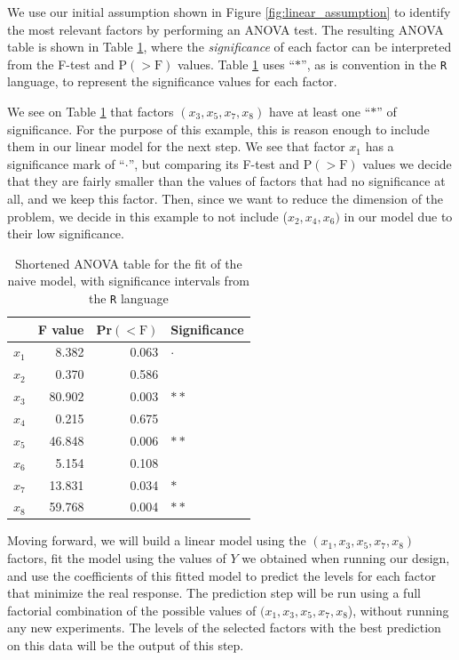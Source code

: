 \documentclass[conference]{IEEEtran}
\begin{document}
We use our initial assumption shown in Figure \ref{fig:linear_assumption} to
identify the most relevant factors by performing an ANOVA test. The resulting
ANOVA table is shown in Table \ref{tab:anova_linear}, where the \emph{significance}
of each factor can be interpreted from the F-test and P\((>\text{F})\) values.
Table \ref{tab:anova_linear} uses ``\(*\)'', as is convention in the \texttt{R}
language, to represent the significance values for each factor.

We see on Table \ref{tab:anova_linear} that factors \((x_3,x_5,x_7,x_8)\) have at
least one ``\(*\)'' of significance. For the purpose of this example, this is
reason enough to include them in our linear model for the next step. We see that
factor \(x_1\) has a significance mark of ``\(\cdot\)'', but comparing its F-test and
P\((>\text{F})\) values we decide that they are fairly smaller than the values of
factors that had no significance at all, and we keep this factor. Then, since we
want to reduce the dimension of the problem, we decide in this example to not
include (\(x_2,x_4,x_6)\) in our model due to their low significance.

\begin{table}[ht]
\centering
\caption{Shortened ANOVA table for the fit of the naive model, with significance intervals from the \texttt{R} language}
\label{tab:anova_linear}
\begingroup\small
\begin{tabular}{lrrl}
  \toprule
 & F value & Pr$(<\text{F})$ & Significance \\
  \midrule
$x_1$ & 8.382 & 0.063 & $\cdot$ \\
  $x_2$ & 0.370 & 0.586 &   \\
  $x_3$ & 80.902 & 0.003 & $**$ \\
  $x_4$ & 0.215 & 0.675 &   \\
  $x_5$ & 46.848 & 0.006 & $**$ \\
  $x_6$ & 5.154 & 0.108 &   \\
  $x_7$ & 13.831 & 0.034 & $*$ \\
  $x_8$ & 59.768 & 0.004 & $**$ \\
   \bottomrule
\end{tabular}
\endgroup
\end{table}

Moving forward, we will build a linear model using the \((x_1,x_3,x_5,x_7,x_8)\)
factors, fit the model using the values of \(Y\) we obtained when running our
design, and use the coefficients of this fitted model to predict the levels for
each factor that minimize the real response. The prediction step will be run
using a full factorial combination of the possible values of
\((x_1,x_3,x_5,x_7,x_8\)), without running any new experiments. The levels of the
selected factors with the best prediction on this data will be the output of
this step.
\end{document}
